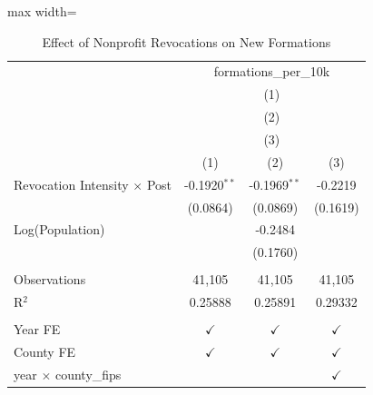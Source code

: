 
\begin{table}[htbp]
   \caption{\label{tab:formations} Effect of Nonprofit Revocations on New Formations}
   \bigskip
   \centering
   \begin{adjustbox}{max width=\textwidth}
   \begin{tabular}{lccc}
      \toprule
       & \multicolumn{3}{c}{formations\_per\_10k}\\
       & \multicolumn{3}{c}{(1)} \\ 
       & \multicolumn{3}{c}{(2)} \\ 
       & \multicolumn{3}{c}{(3)} \\ 
                                          & (1)            & (2)            & (3)\\  
      \midrule 
      Revocation Intensity $\times$ Post  & -0.1920$^{**}$ & -0.1969$^{**}$ & -0.2219\\   
                                          & (0.0864)       & (0.0869)       & (0.1619)\\   
      Log(Population)                     &                & -0.2484        &   \\   
                                          &                & (0.1760)       &   \\   
       \\
      Observations                        & 41,105         & 41,105         & 41,105\\  
      R$^2$                               & 0.25888        & 0.25891        & 0.29332\\  
       \\
      Year FE                             & $\checkmark$   & $\checkmark$   & $\checkmark$\\   
      County FE                           & $\checkmark$   & $\checkmark$   & $\checkmark$\\   
      year $\times $ county\_fips         &                &                & $\checkmark$\\   
      \bottomrule
   \end{tabular}
   \end{adjustbox}
\end{table}



